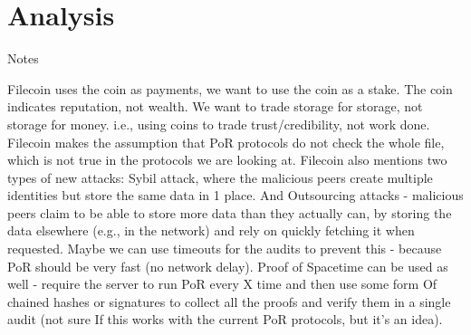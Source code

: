 \label{chapter:analysis}
\chapter{Analysis}






Notes

Filecoin uses the coin as payments, we want to use the coin as a stake.
The coin indicates reputation, not wealth.
We want to trade storage for storage, not storage for money.
i.e., using coins to trade trust/credibility, not work done.
Filecoin makes the assumption that PoR protocols do not check the whole file,
which is not true in the protocols we are looking at.
Filecoin also mentions two types of new attacks:
Sybil attack, where the malicious peers create multiple identities but store the same data in 1 place.
And Outsourcing attacks - malicious peers claim to be able to store more data than they actually can,
by storing the data elsewhere (e.g., in the network) and rely on quickly fetching it when requested.
Maybe we can use timeouts for the audits to prevent this - because PoR should be very fast (no network delay).
Proof of Spacetime can be used as well - require the server to run PoR every X time and then use some form Of
chained hashes or signatures to collect all the proofs and verify them in a single audit (not sure If
this works with the current PoR protocols, but it's an idea).
